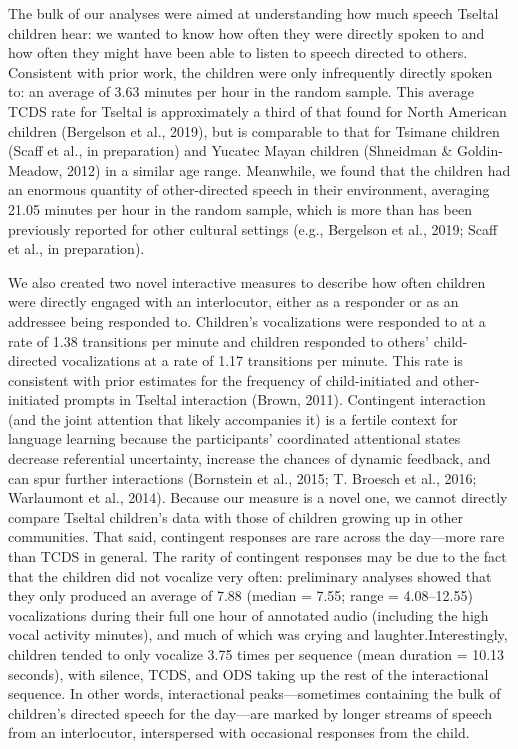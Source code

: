 \documentclass[floatsintext,man]{apa6}
\theoremstyle{definition}
\theoremstyle{definition}
\theoremstyle{definition}
\theoremstyle{remark}
\begin{document}
The bulk of our analyses were aimed at understanding how much speech
Tseltal children hear: we wanted to know how often they were directly
spoken to and how often they might have been able to listen to speech
directed to others. Consistent with prior work, the children were only
infrequently directly spoken to: an average of 3.63 minutes per hour in
the random sample. This average TCDS rate for Tseltal is approximately a
third of that found for North American children (Bergelson et al.,
2019), but is comparable to that for Tsimane children (Scaff et al., in
preparation) and Yucatec Mayan children (Shneidman \& Goldin-Meadow,
2012) in a similar age range. Meanwhile, we found that the children had
an enormous quantity of other-directed speech in their environment,
averaging 21.05 minutes per hour in the random sample, which is more
than has been previously reported for other cultural settings (e.g.,
Bergelson et al., 2019; Scaff et al., in preparation).

We also created two novel interactive measures to describe how often
children were directly engaged with an interlocutor, either as a
responder or as an addressee being responded to. Children's
vocalizations were responded to at a rate of 1.38 transitions per minute
and children responded to others' child-directed vocalizations at a rate
of 1.17 transitions per minute. This rate is consistent with prior
estimates for the frequency of child-initiated and other-initiated
prompts in Tseltal interaction (Brown, 2011). Contingent interaction
(and the joint attention that likely accompanies it) is a fertile
context for language learning because the participants' coordinated
attentional states decrease referential uncertainty, increase the
chances of dynamic feedback, and can spur further interactions
(Bornstein et al., 2015; T. Broesch et al., 2016; Warlaumont et al.,
2014). Because our measure is a novel one, we cannot directly compare
Tseltal children's data with those of children growing up in other
communities. That said, contingent responses are rare across the
day---more rare than TCDS in general. The rarity of contingent responses
may be due to the fact that the children did not vocalize very often:
preliminary analyses showed that they only produced an average of 7.88
(median = 7.55; range = 4.08--12.55) vocalizations during their full one
hour of annotated audio (including the high vocal activity minutes), and
much of which was crying and laughter.Interestingly, children tended to
only vocalize 3.75 times per sequence (mean duration = 10.13 seconds),
with silence, TCDS, and ODS taking up the rest of the interactional
sequence. In other words, interactional peaks---sometimes containing the
bulk of children's directed speech for the day---are marked by longer
streams of speech from an interlocutor, interspersed with occasional
responses from the child.
\end{document}
